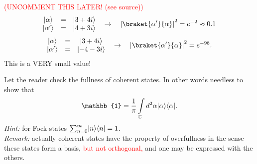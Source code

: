 	\textcolor{red}{(UNCOMMENT THIS LATER! (see source))}
	\begin{equation}
	\begin{matrix}
	\ket{\alpha} &=& \ket{3+4i} \\
	\ket{\alpha'} &=& \ket{4+3i} \\
	\end{matrix}
	\quad \to \quad \left|\braket{\alpha'}{\alpha}\right|^2 = e^{-2} \approx 0.1
	\end{equation}
	\begin{equation}
	\begin{matrix}
	\ket{\alpha} &=& \ket{3+4i} \\
	\ket{\alpha'} &=& \ket{-4-3i} \\
	\end{matrix}
	\quad \to \quad \left|\braket{\alpha'}{\alpha}\right|^2  = e^{-98}.
	\end{equation}
	This is a VERY small value!

\begin{hw}
Let the reader check the fullness of coherent states. In other words needless to show that
\begin{equation}
	\mathbb{1} = \frac{1}{\pi} \int \limits_{\mathbb{C}} d^2 \alpha \ket{\alpha} \bra{\alpha}.
\end{equation}
\textit{Hint:} for Fock states $\sum_{n=0}^{\infty} \lvert n\rangle \langle n\rvert = 1$.\\
\textit{Remark:} actually coherent states have the property of overfullness in the sense these states form a basis,  {\textcolor{red}{ but not orthogonal,  }} and one may be expressed with the others.
\end{hw}

